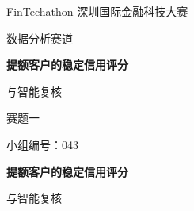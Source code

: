 \documentclass[a4paper,10pt]{article}
\begin{document}
\begin{titlepage}
\centering
\vspace*{34mm}
{\fontsize{14bp}{21bp} FinTechathon 深圳国际金融科技大赛\par}
\vspace{8mm}
{\fontsize{12bp}{18bp}\selectfont 数据分析赛道\par}
\vspace{32mm}
{\fontsize{21bp}{33bp}\selectfont\bfseries 提额客户的稳定信用评分\par 与智能复核\par}
\vspace{15mm}
{\fontsize{13bp}{20bp}\selectfont 赛题一\par}
\vspace{36mm}
{\fontsize{12bp}{18bp}\selectfont 小组编号：043\par}
\end{titlepage}
\begin{center}{\fontsize{14bp}{21bp}\selectfont\bfseries 提额客户的稳定信用评分\par 与智能复核\par}\end{center}
\end{document}
